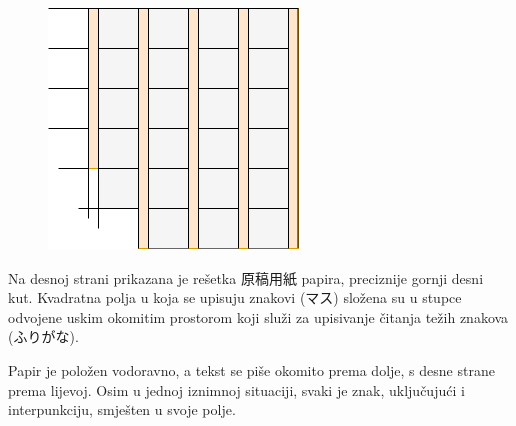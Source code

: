 
\author{Tomislav Mamić}


	
		
	\begin{figure}
		\centering
		\includegraphics[width=.25\textwidth]{017_pisanje_res/a1.png}
	\end{figure}

	Na desnoj strani prikazana je rešetka 原稿用紙 papira, preciznije gornji desni kut. Kvadratna polja u koja se upisuju znakovi (マス) složena su u stupce odvojene uskim okomitim prostorom koji služi za upisivanje čitanja težih znakova (ふりがな).
	
	Papir je položen vodoravno, a tekst se piše okomito prema dolje, s desne strane prema lijevoj. Osim u jednoj iznimnoj situaciji, svaki je znak, uključujući i interpunkciju, smješten u svoje polje.
	
	
